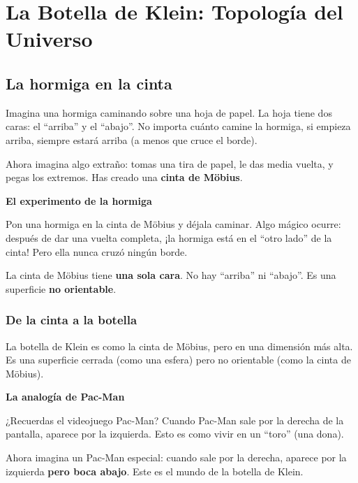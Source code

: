 \documentclass[12pt,a4paper,openany]{book}
\begin{document}
\chapter{La Botella de Klein: Topología del Universo}

\begin{nivelnarrativo}

\section*{La hormiga en la cinta}

Imagina una hormiga caminando sobre una hoja de papel. La hoja tiene dos caras: el ``arriba'' y el ``abajo''. No importa cuánto camine la hormiga, si empieza arriba, siempre estará arriba (a menos que cruce el borde).

Ahora imagina algo extraño: tomas una tira de papel, le das media vuelta, y pegas los extremos. Has creado una \textbf{cinta de Möbius}.

\begin{analogiabox}
\textbf{El experimento de la hormiga}

Pon una hormiga en la cinta de Möbius y déjala caminar. Algo mágico ocurre: después de dar una vuelta completa, ¡la hormiga está en el ``otro lado'' de la cinta! Pero ella nunca cruzó ningún borde.

La cinta de Möbius tiene \textbf{una sola cara}. No hay ``arriba'' ni ``abajo''. Es una superficie \textbf{no orientable}.
\end{analogiabox}

\subsection*{De la cinta a la botella}

La botella de Klein es como la cinta de Möbius, pero en una dimensión más alta. Es una superficie cerrada (como una esfera) pero no orientable (como la cinta de Möbius).

\begin{analogiabox}
\textbf{La analogía de Pac-Man}

¿Recuerdas el videojuego Pac-Man? Cuando Pac-Man sale por la derecha de la pantalla, aparece por la izquierda. Esto es como vivir en un ``toro'' (una dona).

Ahora imagina un Pac-Man especial: cuando sale por la derecha, aparece por la izquierda \textbf{pero boca abajo}. Este es el mundo de la botella de Klein.


\end{analogiabox}
\end{nivelnarrativo}
\end{document}
